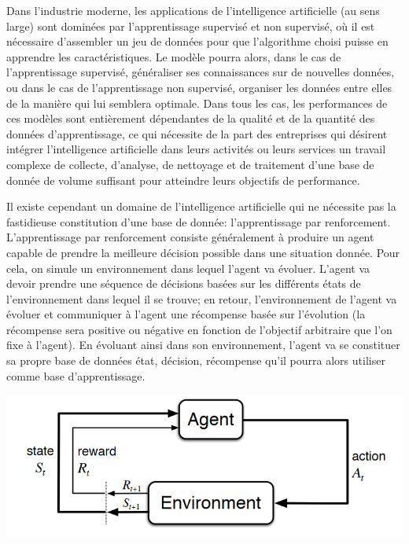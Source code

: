 \documentclass[a4paper,12pt]{article}
\begin{document}
Dans l'industrie moderne, les applications de l'intelligence artificielle (au sens large) sont dominées par l'apprentissage supervisé et non supervisé, où il est nécessaire d'assembler un jeu de données pour que l'algorithme choisi puisse en apprendre les caractéristiques. Le modèle pourra alors, dans le cas de l'apprentissage supervisé, généraliser ses connaissances sur de nouvelles données, ou dans le cas de l'apprentissage non supervisé, organiser les données entre elles de la manière qui lui semblera optimale. Dans tous les cas, les performances de ces modèles sont entièrement dépendantes de la qualité et de la quantité des données d'apprentissage, ce qui nécessite de la part des entreprises qui désirent intégrer l'intelligence artificielle dans leurs activités ou leurs services un travail complexe de collecte, d'analyse, de nettoyage et de traitement d'une base de donnée de volume suffisant pour atteindre leurs objectifs de performance.\par
\medskip
Il existe cependant un domaine de l'intelligence artificielle qui ne nécessite pas la fastidieuse constitution d'une base de donnée: l'apprentissage par renforcement. L'apprentissage par renforcement consiste généralement à produire un agent capable de prendre la meilleure décision possible dans une situation donnée. Pour cela, on simule un environnement dans lequel l'agent va évoluer. L'agent va devoir prendre une séquence de décisions basées sur les différents états de l'environnement dans lequel il se trouve; en retour, l'environnement de l'agent va évoluer et communiquer à l'agent une récompense basée sur l'évolution (la récompense sera positive ou négative en fonction de l'objectif arbitraire que l'on fixe à l'agent). En évoluant ainsi dans son environnement, l'agent va se constituer sa propre base de données {état, décision, récompense} qu'il pourra alors utiliser comme base d'apprentissage.\par

\begin{center}
\includegraphics[width=1\textwidth]{E3_images/agent-environment_cropped.png}\par
\end{center}
\end{document}
